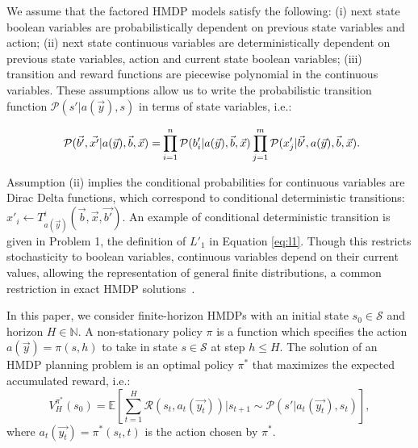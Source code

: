 \documentclass[letterpaper]{article}
\begin{document}
We assume that the factored HMDP models satisfy the following: (i) next state boolean variables are probabilistically dependent on previous state variables and action; (ii) next state continuous variables are deterministically dependent on previous state variables, action and current state boolean variables; (iii) transition and reward functions are piecewise polynomial in the continuous variables. 
These assumptions allow us to write the probabilistic transition function $\mathcal{P}(s' | a(\vec{y}),s)$ in terms of state variables, i.e.:

{\small
\begin{equation*}
\hspace{-0.6mm} \mathcal{P}(\vec{b'},\vec{x'} | a(\vec{y}),\vec{b},\vec{x}) =\hspace{-0.2mm} \prod_{i=1}^{n} \mathcal{P}(b_i' | a(\vec{y}),\vec{b},\vec{x}) \prod_{j=1}^{m} \mathcal{P}(x_j' | \vec{b'}, a(\vec{y}),\vec{b},\vec{x}).\hspace{-2mm}
\end{equation*}
}

Assumption (ii) implies the conditional probabilities for continuous variables are Dirac Delta functions, which correspond to conditional deterministic transitions: $x'_i \gets T^i_{a(\vec{y})}(\vec{b},\vec{x},\vec{b'})$. An example of conditional deterministic transition is given in Problem 1, the definition of $L'_1$ in Equation \ref{eq:l1}.
Though this restricts stochasticity to boolean variables, continuous variables depend on their current values, allowing the representation of general finite distributions, a common restriction in exact HMDP solutions~\cite{feng04,meuleau09HAO,zamani12}.

In this paper, we consider finite-horizon HMDPs with an initial state $s_0 \in \mathcal{S}$ and horizon $H \in \mathbb{N}$.
A non-stationary policy $\pi$ is a function which specifies the action $a(\vec{y}) = \pi(s, h)$ to take in state $s \in \mathcal{S}$ at step $h \leq H$.
The solution of an HMDP planning problem is an optimal policy $\pi^*$ that maximizes the expected accumulated reward, i.e.:%
{\small
\begin{equation*}
V_{H}^{\pi^*}(s_0)= \mathbb{E} \left[ \sum_{t=1}^{H} \mathcal{R}(s_t, a_t(\vec{y_t})) \Big| s_{t+1} \sim \mathcal{P}(s'|a_t(\vec{y_t}),s_{t}) \right], %
\end{equation*}
}
where $a_t(\vec{y_t}) = \pi^*(s_t,t)$ is the action chosen by $\pi^*$.

\end{document}
